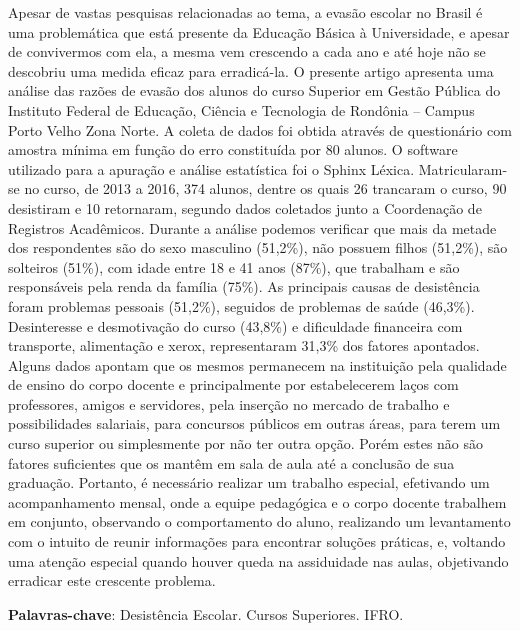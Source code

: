 \documentclass[article,12pt,onesidea,4paper,english,brazil]{abntex2}
\begin{document}
	\noindent Apesar de vastas pesquisas relacionadas ao tema, a evasão escolar no Brasil é uma
	problemática que está presente da Educação Básica à Universidade, e apesar de
	convivermos com ela, a mesma vem crescendo a cada ano e até hoje não se
	descobriu uma medida eficaz para erradicá-la. O presente artigo apresenta uma
	análise das razões de evasão dos alunos do curso Superior em Gestão Pública do
	Instituto Federal de Educação, Ciência e Tecnologia de Rondônia – Campus Porto
	Velho Zona Norte. A coleta de dados foi obtida através de questionário com amostra
	mínima em função do erro constituída por 80 alunos. O software utilizado para a
	apuração e análise estatística foi o Sphinx Léxica. Matricularam-se no curso, de
	2013 a 2016, 374 alunos, dentre os quais 26 trancaram o curso, 90 desistiram e 10
	retornaram, segundo dados coletados junto a Coordenação de Registros
	Acadêmicos. Durante a análise podemos verificar que mais da metade dos
	respondentes são do sexo masculino (51,2\%), não possuem filhos (51,2\%), são
	solteiros (51\%), com idade entre 18 e 41 anos (87\%), que trabalham e são
	responsáveis pela renda da família (75\%). As principais causas de desistência foram
	problemas pessoais (51,2\%), seguidos de problemas de saúde (46,3\%).
	Desinteresse e desmotivação do curso (43,8\%) e dificuldade financeira com
	transporte, alimentação e xerox, representaram 31,3\% dos fatores apontados.
	Alguns dados apontam que os mesmos permanecem na instituição pela qualidade
	de ensino do corpo docente e principalmente por estabelecerem laços com
	professores, amigos e servidores, pela inserção no mercado de trabalho e
	possibilidades salariais, para concursos públicos em outras áreas, para terem um
	curso superior ou simplesmente por não ter outra opção. Porém estes não são
	fatores suficientes que os mantêm em sala de aula até a conclusão de sua
	graduação. Portanto, é necessário realizar um trabalho especial, efetivando um
	acompanhamento mensal, onde a equipe pedagógica e o corpo docente trabalhem
	em conjunto, observando o comportamento do aluno, realizando um levantamento
	com o intuito de reunir informações para encontrar soluções práticas, e, voltando
	uma atenção especial quando houver queda na assiduidade nas aulas, objetivando
	erradicar este crescente problema.
	
	\vspace{\onelineskip}
	
	\noindent
	\textbf{Palavras-chave}: Desistência Escolar. Cursos Superiores. IFRO.
	
\end{document}
